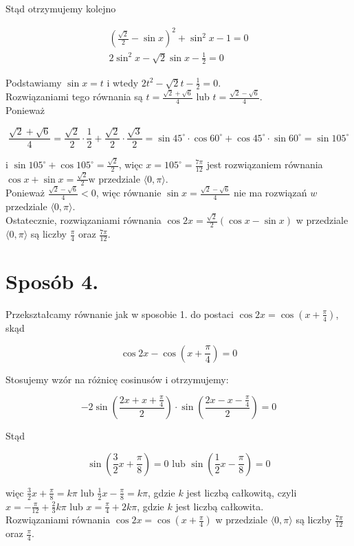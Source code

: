 \documentclass[10pt]{article}
\begin{document}
Stąd otrzymujemy kolejno

$$
\begin{gathered}
\left(\frac{\sqrt{2}}{2}-\sin x\right)^{2}+\sin ^{2} x-1=0 \\
2 \sin ^{2} x-\sqrt{2} \sin x-\frac{1}{2}=0
\end{gathered}
$$

Podstawiamy $\sin x=t$ i wtedy $2 t^{2}-\sqrt{2} t-\frac{1}{2}=0$.\\
Rozwiązaniami tego równania są $t=\frac{\sqrt{2}+\sqrt{6}}{4}$ lub $t=\frac{\sqrt{2}-\sqrt{6}}{4}$.\\
Ponieważ

$$
\frac{\sqrt{2}+\sqrt{6}}{4}=\frac{\sqrt{2}}{2} \cdot \frac{1}{2}+\frac{\sqrt{2}}{2} \cdot \frac{\sqrt{3}}{2}=\sin 45^{\circ} \cdot \cos 60^{\circ}+\cos 45^{\circ} \cdot \sin 60^{\circ}=\sin 105^{\circ}
$$

i $\sin 105^{\circ}+\cos 105^{\circ}=\frac{\sqrt{2}}{2}$, więc $x=105^{\circ}=\frac{7 \pi}{12}$ jest rozwiązaniem równania $\cos x+\sin x=\frac{\sqrt{2}}{2} \mathrm{w}$ przedziale $\langle 0, \pi\rangle$.\\
Ponieważ $\frac{\sqrt{2}-\sqrt{6}}{4}<0$, więc równanie $\sin x=\frac{\sqrt{2}-\sqrt{6}}{4}$ nie ma rozwiązań $w$ przedziale $\langle 0, \pi\rangle$.\\
Ostatecznie, rozwiązaniami równania $\cos 2 x=\frac{\sqrt{2}}{2}(\cos x-\sin x)$ w przedziale $\langle 0, \pi\rangle$ są liczby $\frac{\pi}{4}$ oraz $\frac{7 \pi}{12}$.

\section*{Sposób 4.}
Przekształcamy równanie jak w sposobie 1. do postaci $\cos 2 x=\cos \left(x+\frac{\pi}{4}\right)$, skąd

$$
\cos 2 x-\cos \left(x+\frac{\pi}{4}\right)=0
$$

Stosujemy wzór na różnicę cosinusów i otrzymujemy:

$$
-2 \sin \left(\frac{2 x+x+\frac{\pi}{4}}{2}\right) \cdot \sin \left(\frac{2 x-x-\frac{\pi}{4}}{2}\right)=0
$$

Stąd

$$
\sin \left(\frac{3}{2} x+\frac{\pi}{8}\right)=0 \text { lub } \sin \left(\frac{1}{2} x-\frac{\pi}{8}\right)=0
$$

więc $\frac{3}{2} x+\frac{\pi}{8}=k \pi$ lub $\frac{1}{2} x-\frac{\pi}{8}=k \pi$, gdzie $k$ jest liczbą całkowitą, czyli $x=-\frac{\pi}{12}+\frac{2}{3} k \pi$ lub $x=\frac{\pi}{4}+2 k \pi$, gdzie $k$ jest liczbą całkowita.\\
Rozwiązaniami równania $\cos 2 x=\cos \left(x+\frac{\pi}{4}\right)$ w przedziale $\langle 0, \pi\rangle$ są liczby $\frac{7 \pi}{12}$ oraz $\frac{\pi}{4}$.
\end{document}
